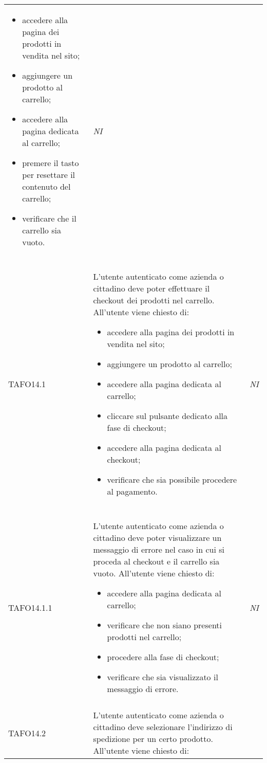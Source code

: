 \begin{longtable}{ >{\centering}p{} >{}p{}
			>{\centering}p{}}
		 \begin{itemize}
		 	\item accedere alla pagina dei prodotti in vendita nel sito;
		 	\item aggiungere un prodotto al carrello;
		 	\item accedere alla pagina dedicata al carrello;
		 	\item premere il tasto per resettare il contenuto del carrello;
		 	\item verificare che il carrello sia vuoto.
		 \end{itemize} & \textit{NI}\\ \tabularnewline
\hypertarget{TAFO14.1}{TAFO14.1} & L'utente autenticato come azienda o cittadino deve poter effettuare il
		 checkout dei prodotti nel carrello. All'utente viene chiesto di:
		 \begin{itemize}
		 	\item accedere alla pagina dei prodotti in vendita nel sito;
		 	\item aggiungere un prodotto al carrello;
		 	\item accedere alla pagina dedicata al carrello;
		 	\item cliccare sul pulsante dedicato alla fase di checkout;
		 	\item accedere alla pagina dedicata al checkout;
		 	\item verificare che sia possibile procedere al pagamento.
		 \end{itemize} & \textit{NI}\\ \tabularnewline
\hypertarget{TAFO14.1.1}{TAFO14.1.1} & L'utente autenticato come azienda o cittadino deve poter visualizzare un
		 messaggio di errore nel caso in cui si proceda al checkout e il carrello sia
		 vuoto. All'utente viene chiesto di:
		 \begin{itemize}
		 	\item accedere alla pagina dedicata al carrello;
		 	\item verificare che non siano presenti prodotti nel carrello;
		 	\item procedere alla fase di checkout;
		 	\item verificare che sia visualizzato il messaggio di errore.
		 \end{itemize} & \textit{NI}\\ \tabularnewline
\hypertarget{TAFO14.2}{TAFO14.2} & L'utente autenticato come azienda o cittadino deve selezionare l'indirizzo di
		 spedizione per un certo prodotto. All'utente viene chiesto di:

\end{longtable}
